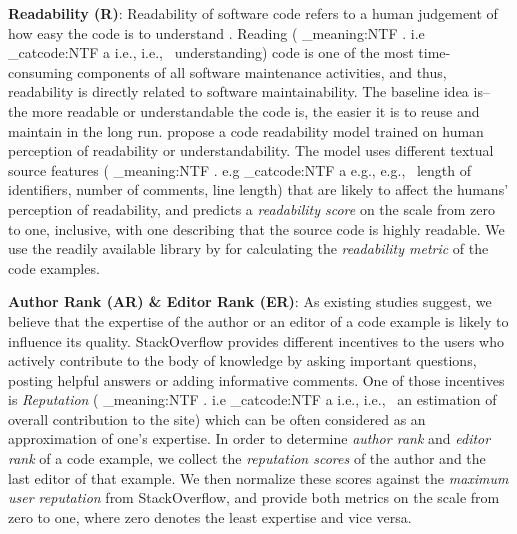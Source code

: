 \documentclass[conference]{IEEEtran}
\makeatletter
\newcommand\latinabbrev[1]{
  \peek_meaning:NTF . {%
    #1\@}%
  { \peek_catcode:NTF a {%
      #1., \@ }%
    {#1., \@}}}
\def\eg{\latinabbrev{e.g}}
\def\ie{\latinabbrev{i.e}}
\makeatother
\begin{document}
\textbf{Readability (R)}: Readability of software code refers to a human judgement of how easy the code is to understand \cite{readability}. Reading (\ie\ understanding) code is one of the most time-consuming components of all software maintenance activities, and thus, readability is directly related to software maintainability. 
The baseline idea is-- the more readable or understandable the code is, the easier it is to reuse and maintain in the long run. \citet{readability} propose a code readability model trained on human perception of readability or understandability. The model uses different textual source features (\eg\ length of identifiers, number of comments, line length) that are likely to affect the humans' perception of readability, and predicts a \emph{readability score} on the scale from zero to one, inclusive, with one describing that the source code is highly readable. We use the readily available library\cite{readlib} by \citet{readability} for calculating the \emph{readability metric} of the code examples.
 
\textbf{Author Rank (AR) \& Editor Rank (ER)}: As existing studies \cite{specmining} suggest, we believe that the expertise of the author or an editor of a code example is likely to influence its quality. 
StackOverflow provides different incentives to the users who actively contribute to the body of knowledge by asking important questions, posting helpful answers or adding informative comments. One of those incentives is \emph{Reputation} (\ie\ an estimation of overall contribution to the site) which can be often considered as an approximation of one's expertise. 
In order to determine \emph{author rank} and \emph{editor rank} of a code example, we collect the \emph{reputation scores} of the author and the last editor of that example. We then normalize these scores against the \emph{maximum user reputation} from StackOverflow, and provide both metrics on the scale from zero to one, where zero denotes the least expertise and vice versa.
\end{document}

